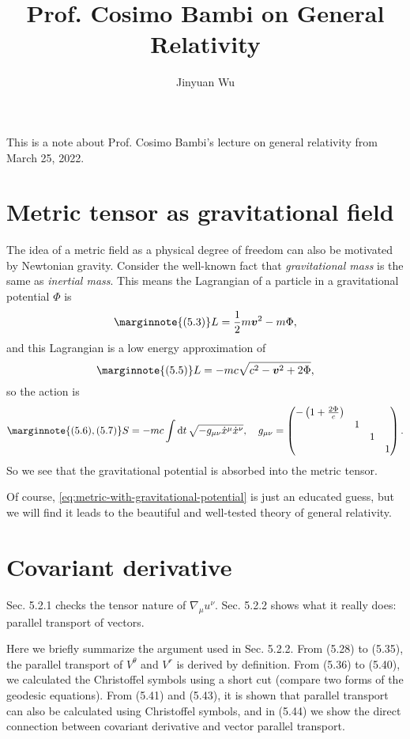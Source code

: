 \documentclass[hyperref, a4paper]{article}
\title{Prof. Cosimo Bambi on General Relativity}
\author{Jinyuan Wu}
\begin{document}
\maketitle

This is a note about Prof. Cosimo Bambi's lecture on general relativity from March 25, 2022.

\section{Metric tensor as gravitational field}

The idea of a metric field as a physical degree of freedom can also be motivated by Newtonian gravity.
Consider the well-known fact that \emph{gravitational mass} is the same as \emph{inertial mass}. 
This means the Lagrangian of a particle in a gravitational potential $\Phi$ is 
\begin{equation} \marginnote{(5.3)}
    L = \frac{1}{2} m \vb*{v}^2 - m \Phi,
\end{equation}
and this Lagrangian is a low energy approximation of 
\begin{equation} \marginnote{(5.5)}
    L = - m c \sqrt{c^2 - \vb*{v}^2 + 2 \Phi},
    \label{eq:metric-with-gravitational-potential}
\end{equation}
so the action is 
\begin{equation} \marginnote{(5.6), (5.7)}
    S = - mc \int \dd{t} \sqrt{- g_{\mu \nu} \dot{x}^\mu \dot{x}^\nu}, \quad g_{\mu \nu} = \pmqty{\dmat{- \left(1 + \frac{2 \Phi}{c}\right), 1, 1, 1}}.
\end{equation}
So we see that the gravitational potential is absorbed into the metric tensor. 

Of course, \eqref{eq:metric-with-gravitational-potential} is just an educated guess, but we will find it leads 
to the beautiful and well-tested theory of general relativity.

\section{Covariant derivative}

Sec. 5.2.1 checks the tensor nature of $\nabla_\mu u^\nu$. 
Sec. 5.2.2 shows what it really does: parallel transport of vectors.

Here we briefly summarize the argument used in Sec. 5.2.2. From (5.28) to (5.35), the parallel transport 
of $V^\theta$ and $V^r$ is derived by definition. From (5.36) to (5.40), we calculated the Christoffel 
symbols using a short cut (compare two forms of the geodesic equations). From (5.41) and (5.43), 
it is shown that parallel transport can also be calculated using Christoffel symbols, and in (5.44) 
we show the direct connection between covariant derivative and vector parallel transport.
\end{document}
